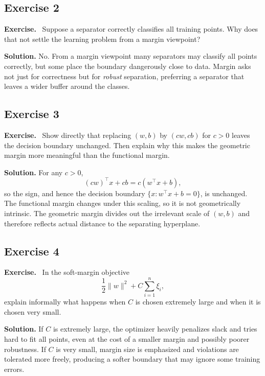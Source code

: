 \documentclass[11pt]{article}
\newenvironment{exercisebox}{\begin{framed}\noindent\textbf{Exercise.}\ }{\end{framed}}
\begin{document}
\subsection*{Exercise 2}
\begin{exercisebox}
Suppose a separator correctly classifies all training points. Why does that not settle the learning problem from a margin viewpoint?
\end{exercisebox}
\textbf{Solution.} No. From a margin viewpoint many separators may classify all points correctly, but some place the boundary dangerously close to data. Margin asks not just for correctness but for \emph{robust} separation, preferring a separator that leaves a wider buffer around the classes.

\subsection*{Exercise 3}
\begin{exercisebox}
Show directly that replacing $(w,b)$ by $(cw,cb)$ for $c>0$ leaves the decision boundary unchanged. Then explain why this makes the geometric margin more meaningful than the functional margin.
\end{exercisebox}
\textbf{Solution.} For any $c>0$,
\[
(cw)^\top x+cb=c(w^\top x+b),
\]
so the sign, and hence the decision boundary $\{x:w^\top x+b=0\}$, is unchanged. The functional margin changes under this scaling, so it is not geometrically intrinsic. The geometric margin divides out the irrelevant scale of $(w,b)$ and therefore reflects actual distance to the separating hyperplane.

\subsection*{Exercise 4}
\begin{exercisebox}
In the soft-margin objective
\[
\frac12\|w\|^2 + C\sum_{i=1}^n \xi_i,
\]
explain informally what happens when $C$ is chosen extremely large and when it is chosen very small.
\end{exercisebox}
\textbf{Solution.} If $C$ is extremely large, the optimizer heavily penalizes slack and tries hard to fit all points, even at the cost of a smaller margin and possibly poorer robustness. If $C$ is very small, margin size is emphasized and violations are tolerated more freely, producing a softer boundary that may ignore some training errors.
\end{document}
